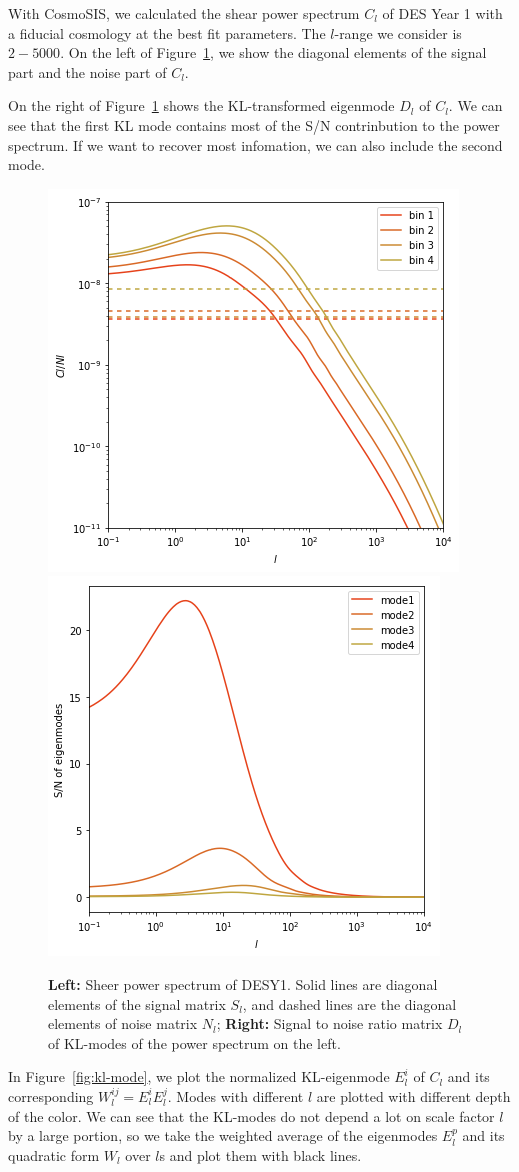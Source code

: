 \documentclass[twocolumn]{\docclass}
\newcommand{\rf}[1]{\ref{fig:#1}}
\begin{document}
With CosmoSIS, we calculated the shear power spectrum $C_l$ of DES Year 1 with a fiducial cosmology at the best fit parameters. The $l$-range we consider is $2-5000$. On the left of Figure~\rf{ClDl}, we show the diagonal elements of the signal part and the noise part of $C_l$. 

On the right of Figure~\rf{ClDl} shows the KL-transformed eigenmode $D_l$ of $C_l$. We can see that the first KL mode contains most of the S/N contrinbution to the power spectrum. If we want to recover most infomation, we can also include the second mode.

\begin{figure}
	\includegraphics[width=0.48\columnwidth]{Cl_pst.png}
	\includegraphics[width=0.48\columnwidth]{Dl_pst.png}
	\caption{\textbf{Left:} Sheer power spectrum of DESY1. Solid lines are diagonal elements of the signal matrix $S_l$, and dashed lines are the diagonal elements of noise matrix $N_l$; \textbf{Right:} Signal to noise ratio matrix $D_l$ of KL-modes of the power spectrum on the left. \label{fig:ClDl}}
\end{figure}

In Figure~\rf{kl-mode}, we plot the normalized KL-eigenmode $E_l^i$ of $C_l$ and its corresponding $W^{ij}_l=E_l^i E_l^j$. Modes with different $l$ are plotted with different depth of the color. We can see that the KL-modes do not depend a lot on scale factor $l$ by a large portion, so we take the weighted average of the eigenmodes $E_l^p$ and its quadratic form $W_l$ over $l$s and plot them with black lines. 
\end{document}
